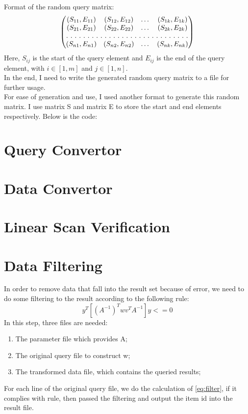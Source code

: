 \documentclass{article}
\begin{document}
Format of the random query matrix:\\
\begin{equation}
\begin{pmatrix}
$$(S_{11},E_{11}) & (S_{12},E_{12}) & \dots & (S_{1k},E_{1k}) \\
(S_{21},E_{21}) & (S_{22},E_{22}) & \dots & (S_{2k},E_{2k}) \\
\hdotsfor[2]{4} \\
(S_{n1},E_{n1}) & (S_{n2},E_{n2}) & \dots & (S_{nk},E_{nk})$$
\end{pmatrix}
\end{equation}
Here, $S_{ij}$ is the start of the query element and $E_{ij}$ is the 
end of the query element, with $i\in[1,m]$ and $j\in[1,n]$.\\
In the end, I need to write the generated random query matrix to a
file for further usage. \\
For ease of generation and use, I used another format to generate this
random matrix. I use matrix S and matrix E to store the start and end
elements respectively. 
Below is the code: 

\section{Query Convertor}


\section{Data Convertor}


\section{Linear Scan Verification}


\section{Data Filtering}
In order to remove data that fall into the result set because of
error, we need to do some filtering to the result according to the
following rule: 
\begin{equation}
y^{T}[(A^{-1})^Twv^TA^{-1}]y <= 0
\label{eq:filter}
\end{equation}
In this step, three files are needed: 
\begin{enumerate}
\item The parameter file which provides A; 
\item The original query file to construct w; 
\item The transformed data file, which contains the queried results; 
\end{enumerate}
For each line of the original query file, we do the calculation of
\ref{eq:filter}, if it complies with rule, then passed the filtering
and output the item id into the result file.\\
\end{document}
